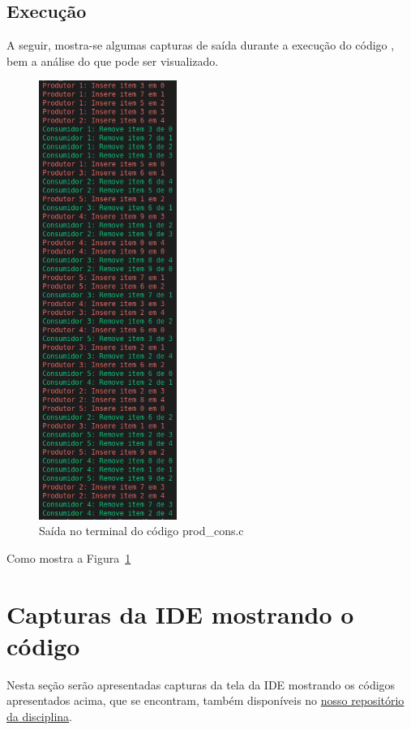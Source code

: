 \documentclass[
	12pt,				%
	openright,			%
	oneside,			%
	a4paper,			%
	chapter=TITLE,		%
	english,			%
	french,				%
	spanish,			%
	brazil				%
	]{abntex2}
\theoremstyle{definition}
\begin{document}
\subsection{Execução}
A seguir, mostra-se algumas capturas de saída durante a execução do código , bem a análise do que pode ser visualizado.
\begin{figure}[h]
    \centering
    \includegraphics[width=0.4\textwidth]{imagens/out_prod_cons.png}
    \caption{Saída no terminal do código prod\_cons.c}
    \label{fig:out_prod_cons}
\end{figure}

Como mostra a Figura~\ref{}
\clearpage
\section{Capturas da IDE mostrando o código}
Nesta seção serão apresentadas capturas da tela da IDE mostrando os códigos apresentados acima, que se encontram, também disponíveis no
\href{https://github.com/jvictorferreira3301/Sistemas_Operacionais}{nosso repositório da disciplina}.
\end{document}
